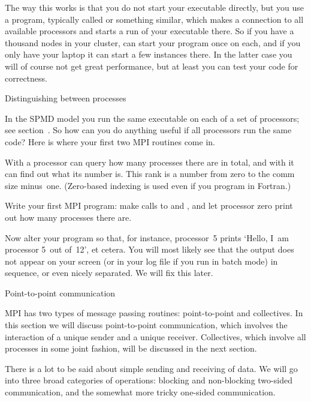 The way this works is that you do not start your executable directly,
but you use a program, typically called  or
something similar, which makes a connection to all available
processors and starts a run of your executable there. So if you have a
thousand nodes in your cluster,  can start your program once
on each, and if you only have your laptop it can start a few instances
there. In the latter case you will of course not get great
performance, but at least you can test your code for correctness.

 {Distinguishing between processes}

In the SPMD model you run the same executable on each of a set of processors; see section~. So how can you do anything useful if all processors run the same code? Here is where your first two MPI routines come in.

With  a processor can query how many
processes there are in total, and with  it
can find out what its number is. This rank is a number from zero to
the comm size minus~one. (Zero-based indexing is used even if you
program in Fortran.)

\begin{exercise}
  \label{ex:hello-world-zero}
  Write your first MPI program: make calls to  and
  , and let processor zero print out how many
  processes there are.

  Now alter your program so that, for instance, processor~5 prints
  `Hello, I~am processor 5~out of~12', et cetera. You will most likely
  see that the output does not appear on your screen (or in your log
  file if you run in batch mode) in sequence, or even nicely
  separated. We will fix this later.
\end{exercise}

 {Point-to-point communication}

MPI has two types of message passing routines: point-to-point and
collectives. In this section we will discuss point-to-point
communication, which involves the interaction of a unique sender and a
unique receiver. Collectives, which involve all processes in some
joint fashion, will be discussed in the next section.

There is a lot to be said about simple sending and receiving of
data. We will go into three broad categories of operations: blocking
and non-blocking two-sided communication, and the somewhat
more tricky one-sided communication.

